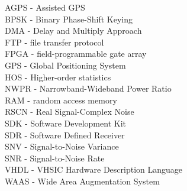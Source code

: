 \noindent
AGPS - Assisted GPS						\\
BPSK - Binary Phase-Shift Keying				\\
DMA - Delay and Multiply Approach				\\
FTP - file transfer protocol					\\
FPGA - field-programmable gate array 				\\
GPS - Global Positioning System					\\
HOS - Higher-order statistics					\\
NWPR - Narrowband-Wideband Power Ratio				\\
RAM - random access memory					\\
RSCN - Real Signal-Complex Noise				\\
SDK - Software Development Kit					\\
SDR - Software Defined Receiver					\\
SNV - Signal-to-Noise Variance					\\
SNR - Signal-to-Noise Rate					\\
VHDL - VHSIC Hardware Description Language			\\
WAAS - Wide Area Augmentation System				\\


\newpage
